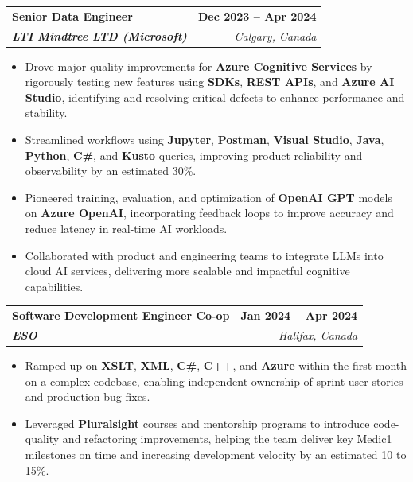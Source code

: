 \documentclass[letterpaper,11pt]{article}
\makeatletter
\newcommand{\resumeItem}[1]{
  \item\small{
    {#1 \vspace{-2pt}}
  }
}
\newcommand{\resumeSubheading}[4]{
  \vspace{-2pt}\item
    \begin{tabular*}{1.0\textwidth}[t]{l@{\extracolsep{\fill}}r}
      \textbf{#1} & \textbf{\small #2} \\
      \textit{\small#3} & \textit{\small #4} \\
    \end{tabular*}\vspace{-7pt}
}
\newcommand{\resumeItemListStart}{\begin{itemize}}
\newcommand{\resumeItemListEnd}{\end{itemize}\vspace{-5pt}}
\makeatother
\begin{document}
    \resumeSubheading
      {\textbf{Senior Data Engineer}}{\textbf{Dec 2023 -- Apr 2024}}
      {\textbf{LTI Mindtree LTD (Microsoft)}}{Calgary, Canada}
      \resumeItemListStart
        \resumeItem{Drove major quality improvements for \textbf{Azure Cognitive Services} by rigorously testing new features using \textbf{SDKs}, \textbf{REST APIs}, and \textbf{Azure AI Studio}, identifying and resolving critical defects to enhance performance and stability.}
        \resumeItem{Streamlined workflows using \textbf{Jupyter}, \textbf{Postman}, \textbf{Visual Studio}, \textbf{Java}, \textbf{Python}, \textbf{C\#}, and \textbf{Kusto} queries, improving product reliability and observability by an estimated 30\%.}
        \resumeItem{Pioneered training, evaluation, and optimization of \textbf{OpenAI GPT} models on \textbf{Azure OpenAI}, incorporating feedback loops to improve accuracy and reduce latency in real-time AI workloads.}
        \resumeItem{Collaborated with product and engineering teams to integrate LLMs into cloud AI services, delivering more scalable and impactful cognitive capabilities.}
      \resumeItemListEnd
    
    \resumeSubheading
      {\textbf{Software Development Engineer Co-op}}{\textbf{Jan 2024 -- Apr 2024}}
      {\textbf{ESO}}{Halifax, Canada}
      \resumeItemListStart
        \resumeItem{Ramped up on \textbf{XSLT}, \textbf{XML}, \textbf{C\#}, \textbf{C++}, and \textbf{Azure} within the first month on a complex codebase, enabling independent ownership of sprint user stories and production bug fixes.}
        \resumeItem{Leveraged \textbf{Pluralsight} courses and mentorship programs to introduce code-quality and refactoring improvements, helping the team deliver key Medic1 milestones on time and increasing development velocity by an estimated 10 to 15\%.}
      \resumeItemListEnd
\end{document}
